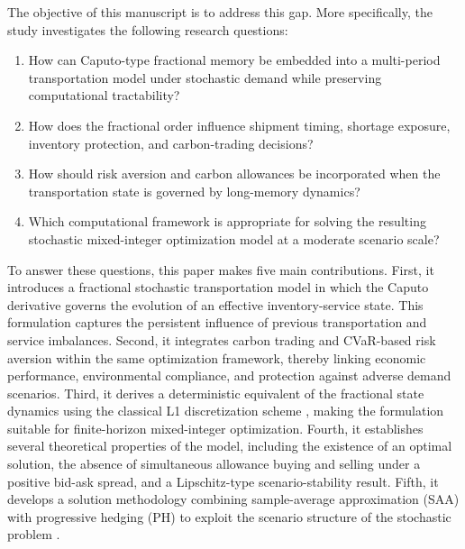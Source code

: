 The objective of this manuscript is to address this gap. More specifically, the study investigates the following research questions:

\begin{enumerate}[label=\textbf{RQ\arabic*.},leftmargin=2.3em]
    \item How can Caputo-type fractional memory be embedded into a multi-period transportation model under stochastic demand while preserving computational tractability?
    
    \item How does the fractional order influence shipment timing, shortage exposure, inventory protection, and carbon-trading decisions?
    
    \item How should risk aversion and carbon allowances be incorporated when the transportation state is governed by long-memory dynamics?
    
    \item Which computational framework is appropriate for solving the resulting stochastic mixed-integer optimization model at a moderate scenario scale?
\end{enumerate}

To answer these questions, this paper makes five main contributions. First, it introduces a fractional stochastic transportation model in which the Caputo derivative governs the evolution of an effective inventory-service state. This formulation captures the persistent influence of previous transportation and service imbalances. Second, it integrates carbon trading and CVaR-based risk aversion within the same optimization framework, thereby linking economic performance, environmental compliance, and protection against adverse demand scenarios. Third, it derives a deterministic equivalent of the fractional state dynamics using the classical L1 discretization scheme \cite{lin2007}, making the formulation suitable for finite-horizon mixed-integer optimization. Fourth, it establishes several theoretical properties of the model, including the existence of an optimal solution, the absence of simultaneous allowance buying and selling under a positive bid-ask spread, and a Lipschitz-type scenario-stability result. Fifth, it develops a solution methodology combining sample-average approximation (SAA) with progressive hedging (PH) to exploit the scenario structure of the stochastic problem \cite{rockafellar1991,shapiro2009}.

